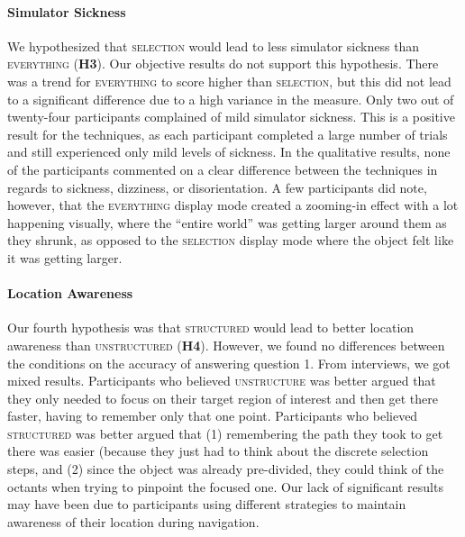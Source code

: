 \paragraph{\textbf{Simulator Sickness}}
We hypothesized that \textsc{selection} would lead to less simulator sickness than \textsc{everything} (\textbf{H3}). Our objective results do not support this hypothesis. There was a trend for \textsc{everything} to score higher than \textsc{selection}, but this did not lead to a significant difference due to a high variance in the measure. Only two out of twenty-four participants complained of mild simulator sickness. This is a positive result for the techniques, as each participant completed a large number of trials and still experienced only mild levels of sickness. In the qualitative results, none of the participants commented on a clear difference between the techniques in regards to sickness, dizziness, or disorientation. A few participants did note, however, that the \textsc{everything} display mode created a zooming-in effect with a lot happening visually, where the ``entire world'' was getting larger around them as they shrunk, as opposed to the \textsc{selection} display mode where the object felt like it was getting larger. 

\paragraph{\textbf{Location Awareness}}
Our fourth hypothesis was that \textsc{structured} would lead to better location awareness than \textsc{unstructured} (\textbf{H4}). However, we found no differences between the conditions on the accuracy of answering question 1. From interviews, we got mixed results. Participants who believed \textsc{unstructure} was better argued that they only needed to focus on their target region of interest and then get there faster, having to remember only that one point. Participants who believed \textsc{structured} was better argued that (1) remembering the path they took to get there was easier (because they just had to think about the discrete selection steps, and (2) since the object was already pre-divided, they could think of the octants when trying to pinpoint the focused one. Our lack of significant results may have been due to participants using different strategies to maintain awareness of their location during navigation.

